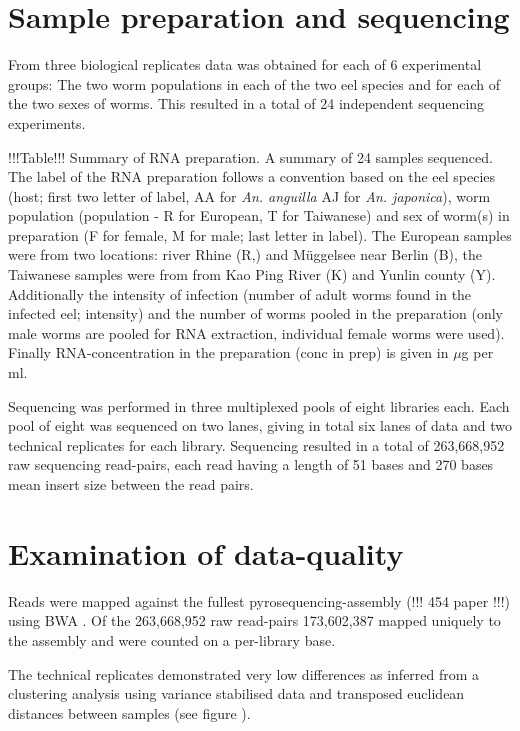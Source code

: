 \documentclass[10pt]{article}
\begin{document}
\section{Sample preparation and sequencing}

From three biological replicates data was obtained for each of 6
experimental groups: The two worm populations in each of the two eel
species and for each of the two sexes of worms. This resulted in a
total of 24 independent sequencing experiments.

!!!Table!!! Summary of RNA preparation. A summary of 24 samples
sequenced. The label of the RNA preparation follows a convention based
on the eel species (host; first two letter of label, AA for
\textit{An. anguilla} AJ for \textit{An. japonica}), worm population
(population - R for European, T for Taiwanese) and sex of worm(s) in
preparation (F for female, M for male; last letter in label). The
European samples were from two locations: river Rhine (R,) and
M\"uggelsee near Berlin (B), the Taiwanese samples were from from Kao
Ping River (K) and Yunlin county (Y). Additionally the intensity of
infection (number of adult worms found in the infected eel; intensity)
and the number of worms pooled in the preparation (only male worms are
pooled for RNA extraction, individual female worms were used). Finally
RNA-concentration in the preparation (conc in prep) is given in $\mu$g
per ml.

Sequencing was performed in three multiplexed pools of eight libraries
each. Each pool of eight was sequenced on two lanes, giving in total
six lanes of data and two technical replicates for each
library. Sequencing resulted in a total of 263,668,952 raw sequencing
read-pairs, each read having a length of 51 bases and 270 bases mean
insert size between the read pairs.

\section{Examination of data-quality}

Reads were mapped against the fullest pyrosequencing-assembly (!!! 454
paper !!!) using BWA \cite{pmid20080505}. Of the 263,668,952 raw
read-pairs 173,602,387 mapped uniquely to the assembly and were
counted on a per-library base.

The technical replicates demonstrated very low differences as inferred
from a clustering analysis using variance stabilised data and
transposed euclidean distances between samples (see figure ).
\end{document}
